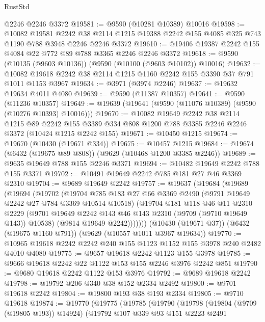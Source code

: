 \begin{lexlean}{RustStd}
\begin{coremodule}
    @2246
    @2246
    @3372
@19581 := @9590 (@10281 @10389) @10016
@19598 := @10082
    @19581
    @2242
    @38
    @2114
    @1215
    @19388
    @2242
    @155
    @4085
    @325
    @743
    @1190
    @788
    @3948
    @2246
    @2246
    @3372
@19610 := @19406 @19387 @2242 @155 @4084 @22 @772 @89 @788 @3365 @2246 @2246 @3372
@19618 := @9590 (@10135 (@9603 @10136)) (@9590 (@10100 (@9603 @10102)) @10016)
@19632 := @10082 @19618 @2242 @38 @2114 @1215 @1160 @2242 @155 @3390 @37 @791 @1011 @1153 @3967
@19634 := @3971 (@3974 @2246)
@19637 := @19632 @19634 @4011 @4080
@19639 := @9590 (@11387 @10357)
@19641 := @9590 (@11236 @10357)
@19649 := @19639 (@19641 (@9590 (@11076 @10389) (@9590 (@10276 @10393) @10016)))
@19670 := @10082
    @19649
    @2242
    @38
    @2114
    @1215
    @89
    @2242
    @155
    @3389
    @334
    @808
    @1200
    @788
    @3385
    @2246
    @2246
    @3372
    (@10424 @1215 @2242 @155)
@19671 := @10450 @1215
@19674 := @19670 (@10430 (@19671 @334))
@19675 := @10457 @1215
@19684 := @19674 (@6432 (@19675 @89 @808)) (@9629 (@10468 @1200 @3385 @2246))
@19689 := @9635 @19649 @788 @155 @2246 @3371
@19694 := @10482 @19649 @2242 @788 @155 @3371
@19702 := @10491 @19649 @2242 @785 @181 @27 @46 @3369 @2310
@19704 := @9689 @19649 @2242
@19757 := @19637
    (@19684
      (@19689
        (@19694
          (@19702
            (@19704
              @785
              @183
              @27
              @66
              @3369
              @2490
              (@9791 @19649 @2242 @27 @784 @3369 @10514 @10518)
              (@19704
                @181
                @118
                @46
                @11
                @2310
                @2229
                (@9701 @19649 @2242 @143 @46 @143 @2310 (@9709 (@9710 @19649 @143)) @10538)
                (@9814 @19649 @2242)))))))
    (@10430 (@19671 @37))
    (@6432 (@19675 @1160 @791))
    (@9629 (@10557 @1011 @3967 @19634))
@19770 := @10965 @19618 @2242 @2242 @240 @155 @1123 @1152 @155 @3978 @240 @2482 @4010 @4080
@19775 := @9657 @19618 @2242 @1123 @155 @3978
@19785 := @9666 @19618 @2242 @22 @1122 @153 @155 @2246 @3976 @2242 @851
@19790 := @9680 @19618 @2242 @1122 @153 @3976
@19792 := @9689 @19618 @2242
@19798 := @19792 @206 @340 @38 @152 @2334 @2492
@19800 := @9701 @19618 @2242
@19804 := @19800 @193 @38 @193 @2334
@19805 := @9710 @19618
@19874 := @19770
    (@19775
      (@19785
        (@19790
          (@19798
            (@19804 (@9709 (@19805 @193)) @14924)
            (@19792
              @107
              @339
              @93
              @151
              @2223
              @2491

\end{coremodule}
\end{lexlean}
